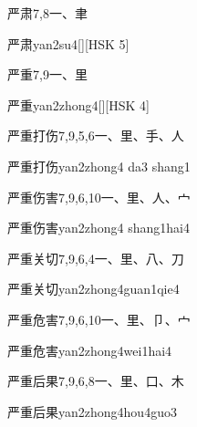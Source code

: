 \begin{entry}{严肃}{7,8}{⼀、⾀}
  \begin{phonetics}{严肃}{yan2su4}[][HSK 5]
  \end{phonetics}
\end{entry}

\begin{entry}{严重}{7,9}{⼀、⾥}
  \begin{phonetics}{严重}{yan2zhong4}[][HSK 4]
  \end{phonetics}
\end{entry}

\begin{entry}{严重打伤}{7,9,5,6}{⼀、⾥、⼿、⼈}
  \begin{phonetics}{严重打伤}{yan2zhong4 da3 shang1}
  \end{phonetics}
\end{entry}

\begin{entry}{严重伤害}{7,9,6,10}{⼀、⾥、⼈、⼧}
  \begin{phonetics}{严重伤害}{yan2zhong4 shang1hai4}
  \end{phonetics}
\end{entry}

\begin{entry}{严重关切}{7,9,6,4}{⼀、⾥、⼋、⼑}
  \begin{phonetics}{严重关切}{yan2zhong4guan1qie4}
  \end{phonetics}
\end{entry}

\begin{entry}{严重危害}{7,9,6,10}{⼀、⾥、⼙、⼧}
  \begin{phonetics}{严重危害}{yan2zhong4wei1hai4}
  \end{phonetics}
\end{entry}

\begin{entry}{严重后果}{7,9,6,8}{⼀、⾥、⼝、⽊}
  \begin{phonetics}{严重后果}{yan2zhong4hou4guo3}
  \end{phonetics}
\end{entry}

